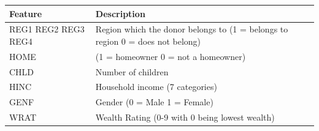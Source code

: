 \documentclass[]{article}
\begin{document}
\begin{longtable}[]{@{}ll@{}}
\toprule
\begin{minipage}[b]{0.20\columnwidth}\raggedright\strut
Feature\strut
\end{minipage} & \begin{minipage}[b]{0.74\columnwidth}\raggedright\strut
Description\strut
\end{minipage}\tabularnewline
\midrule
\endhead
\begin{minipage}[t]{0.20\columnwidth}\raggedright\strut
REG1 REG2 REG3 REG4\strut
\end{minipage} & \begin{minipage}[t]{0.74\columnwidth}\raggedright\strut
Region which the donor belongs to (1 = belongs to region 0 = does not
belong)\strut
\end{minipage}\tabularnewline
\begin{minipage}[t]{0.20\columnwidth}\raggedright\strut
HOME\strut
\end{minipage} & \begin{minipage}[t]{0.74\columnwidth}\raggedright\strut
(1 = homeowner 0 = not a homeowner)\strut
\end{minipage}\tabularnewline
\begin{minipage}[t]{0.20\columnwidth}\raggedright\strut
CHLD\strut
\end{minipage} & \begin{minipage}[t]{0.74\columnwidth}\raggedright\strut
Number of children\strut
\end{minipage}\tabularnewline
\begin{minipage}[t]{0.20\columnwidth}\raggedright\strut
HINC\strut
\end{minipage} & \begin{minipage}[t]{0.74\columnwidth}\raggedright\strut
Household income (7 categories)\strut
\end{minipage}\tabularnewline
\begin{minipage}[t]{0.20\columnwidth}\raggedright\strut
GENF\strut
\end{minipage} & \begin{minipage}[t]{0.74\columnwidth}\raggedright\strut
Gender (0 = Male 1 = Female)\strut
\end{minipage}\tabularnewline
\begin{minipage}[t]{0.20\columnwidth}\raggedright\strut
WRAT\strut
\end{minipage} & \begin{minipage}[t]{0.74\columnwidth}\raggedright\strut
Wealth Rating (0-9 with 0 being lowest wealth)\strut

\end{minipage}
\end{longtable}
\end{document}
